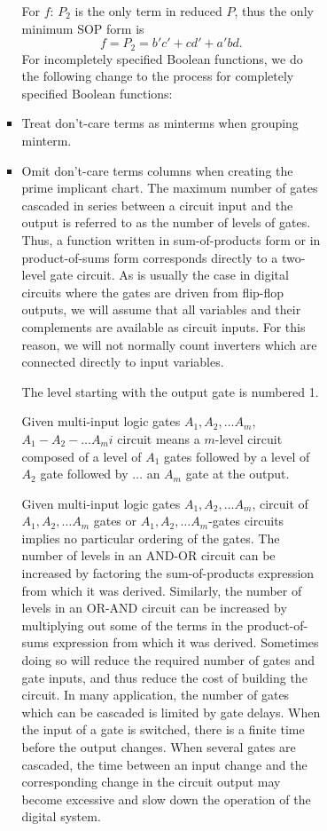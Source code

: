 \documentclass[a4paper,12pt]{article}
\begin{document}
\begin{itemize}
\begin{itemize}
\begin{itemize}
\begin{itemize}
\begin{itemize}
\begin{itemize}
\begin{itemize}
For $f$: $P_2$ is the only term in reduced $P$, thus the only minimum SOP form is 
\[f=P_2=b'c'+cd'+a'bd.\]
For incompletely specified Boolean functions, we do the following change to the process for completely specified Boolean functions:
\ben
\item Treat don't-care terms as minterms when grouping minterm.
\item Omit don't-care terms columns when creating the prime implicant chart.
\een
{}
The maximum number of gates cascaded in series between a circuit input and the output is referred to as the number of levels of gates. Thus, a function written in sum-of-products form or in product-of-sums form corresponds directly to a two-level gate circuit. As is usually the case in digital circuits where the gates are driven from flip-flop outputs, we will assume that all variables and their complements are available as circuit inputs. For this reason, we will not normally count inverters which are connected directly to input variables.

The level starting with the output gate is numbered 1.

Given multi-input logic gates $A_1,A_2,\ldots A_m$, $A_1-A_2-\ldots A_mi$ circuit means a $m$-level circuit composed of a level of $A_1$ gates followed by a level of $A_2$ gate followed by $\ldots$ an $A_m$ gate at the output.

Given multi-input logic gates $A_1,A_2,\ldots A_m$, circuit of $A_1,A_2,\ldots A_m$ gates or $A_1,A_2,\ldots A_m$-gates circuits implies no particular ordering of the gates.
The number of levels in an AND-OR circuit can be increased by factoring the sum-of-products expression from which it was derived. Similarly, the number of levels in an OR-AND circuit can be increased by multiplying out some of the terms in the product-of-sums expression from which it was derived. Sometimes doing so will reduce the required number of gates and gate inputs, and thus reduce the cost of building the circuit. In many application, the number of gates which can be cascaded is limited by gate delays. When the input of a gate is switched, there is a finite time before the output changes. When several gates are cascaded, the time between an input change and the corresponding change in the circuit output may become excessive and slow down the operation of the digital system.


\end{itemize}
\end{itemize}
\end{itemize}
\end{itemize}
\end{itemize}
\end{itemize}
\end{itemize}
\end{document}
